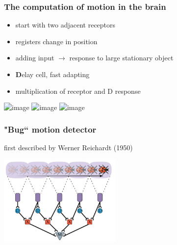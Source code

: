 \documentclass[]{beamer}
\begin{document}
\begin{frame}
\frametitle{The computation of motion in the brain}
\begin{overlayarea}{110mm}{80mm}
\begin{itemize}
 \item<1-> start with two adjacent receptors
 \item<2->[$\rightarrow$] registers change in position
 \item<3-> adding input $\rightarrow$ response to large stationary object
 \item<4-> \textbf{D}elay cell, fast adapting 
 \item<4-> multiplication of receptor and D response
\end{itemize}

 \begin{center}
\includegraphics<1-2>[width=70mm]{figs/l7/reichardt_detector_2cells_1.png}
\includegraphics<3>[width=70mm]{figs/l7/reichardt_detector_2cells_0.png}
\includegraphics<4>[width=70mm]{figs/l7/reichardt_detector_2cells.png}
 \end{center}
\end{overlayarea}
\end{frame}


\begin{frame}
 \frametitle{"Bug`` motion detector}
\begin{overlayarea}{130mm}{80mm}
first described by Werner Reichardt (1950)
 \begin{center}
\includegraphics[width=60mm]{figs/l7/reichardt_detector_manycells.png}
 \end{center}
\end{overlayarea}
\end{frame}
\end{document}
